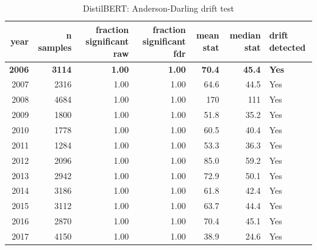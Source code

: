 \begin{table}[ht]
\centering
\caption{DistilBERT: Anderson-Darling drift test}
\label{tab:distilbert_ad}
\begin{tabular}{rrrrrrl}
\toprule
year & n samples & fraction significant raw & fraction significant fdr & mean stat & median stat & drift detected \\
\midrule
\textbf{2006} & \textbf{3114} & \textbf{1.00} & \textbf{1.00} & \textbf{70.4} & \textbf{45.4} & \textbf{Yes} \\
2007 & 2316 & 1.00 & 1.00 & 64.6 & 44.5 & Yes \\
2008 & 4684 & 1.00 & 1.00 & 170 & 111 & Yes \\
2009 & 1800 & 1.00 & 1.00 & 51.8 & 35.2 & Yes \\
2010 & 1778 & 1.00 & 1.00 & 60.5 & 40.4 & Yes \\
2011 & 1284 & 1.00 & 1.00 & 53.3 & 36.3 & Yes \\
2012 & 2096 & 1.00 & 1.00 & 85.0 & 59.2 & Yes \\
2013 & 2942 & 1.00 & 1.00 & 72.9 & 50.1 & Yes \\
2014 & 3186 & 1.00 & 1.00 & 61.8 & 42.4 & Yes \\
2015 & 3112 & 1.00 & 1.00 & 63.7 & 44.4 & Yes \\
2016 & 2870 & 1.00 & 1.00 & 70.4 & 45.1 & Yes \\
2017 & 4150 & 1.00 & 1.00 & 38.9 & 24.6 & Yes \\
\bottomrule
\end{tabular}
\end{table}
